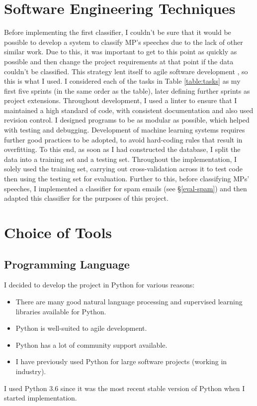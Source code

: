 \documentclass[12pt,a4paper,twoside,openright]{report}
\begin{document}
\section{Software Engineering Techniques} \label{prep-sweng}
	
Before implementing the first classifier, I couldn't be sure that it would be possible to develop a system to classify MP's speeches due to the lack of other similar work. Due to this, it was important to get to this point as quickly as possible and then change the project requirements at that point if the data couldn't be classified. This strategy lent itself to agile software development \cite{agile}, so this is what I used. I considered each of the tasks in Table \ref{table:tasks} as my first five sprints (in the same order as the table), later defining further sprints as project extensions.
\newline
\newline
Throughout development, I used a linter to ensure that I maintained a high standard of code, with consistent documentation and also used revision control. I designed programs to be as modular as possible, which helped with testing and debugging.
\newline
\newline
Development of machine learning systems requires further good practices to be adopted, to avoid hard-coding rules that result in overfitting. To this end, as soon as I had constructed the database, I split the data into a training set and a testing set. Throughout the implementation, I solely used the training set, carrying out cross-validation across it to test code then using the testing set for evaluation. Further to this, before classifying MPs' speeches, I implemented a classifier for spam emails (see \S\ref{eval-spam}) and then adapted this classifier for the purposes of this project.


\section{Choice of Tools} \label{prep-tools}

\subsection{Programming Language}

I decided to develop the project in Python for various reasons:
\begin{itemize}
	\item There are many good natural language processing and supervised learning libraries available for Python.
	\item Python is well-suited to agile development.
	\item Python has a lot of community support available.
	\item I have previously used Python for large software projects (working in industry).
\end{itemize}
I used Python 3.6 since it was the most recent stable version of Python when I started implementation.
\end{document}
